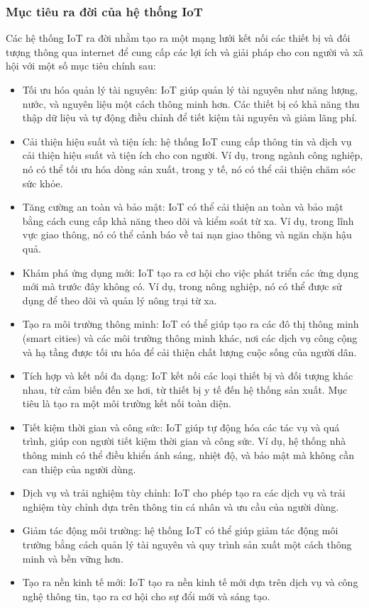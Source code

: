 \documentclass{article} %
\begin{document}
\subsubsection{Mục tiêu ra đời của hệ thống IoT}
Các hệ thống IoT ra đời nhằm tạo ra một mạng lưới kết nối các thiết bị và đối tượng thông qua internet để cung cấp các lợi ích và giải pháp cho con người và xã hội với một số mục tiêu chính sau:
\begin{itemize}
\item Tối ưu hóa quản lý tài nguyên: IoT giúp quản lý tài nguyên như năng lượng, nước, và nguyên liệu một cách thông minh hơn. Các thiết bị có khả năng thu thập dữ liệu và tự động điều chỉnh để tiết kiệm tài nguyên và giảm lãng phí.
\item Cải thiện hiệu suất và tiện ích: hệ thống IoT cung cấp thông tin và dịch vụ cải thiện hiệu suất và tiện ích cho con người. Ví dụ, trong ngành công nghiệp, nó có thể tối ưu hóa dòng sản xuất, trong y tế, nó có thể cải thiện chăm sóc sức khỏe.
\item Tăng cường an toàn và bảo mật: IoT có thể cải thiện an toàn và bảo mật bằng cách cung cấp khả năng theo dõi và kiểm soát từ xa. Ví dụ, trong lĩnh vực giao thông, nó có thể cảnh báo về tai nạn giao thông và ngăn chặn hậu quả.
\item Khám phá ứng dụng mới: IoT tạo ra cơ hội cho việc phát triển các ứng dụng mới mà trước đây không có. Ví dụ, trong nông nghiệp, nó có thể được sử dụng để theo dõi và quản lý nông trại từ xa.
\item Tạo ra môi trường thông minh: IoT có thể giúp tạo ra các đô thị thông minh (smart cities) và các môi trường thông minh khác, nơi các dịch vụ công cộng và hạ tầng được tối ưu hóa để cải thiện chất lượng cuộc sống của người dân.
\item Tích hợp và kết nối đa dạng: IoT kết nối các loại thiết bị và đối tượng khác nhau, từ cảm biến đến xe hơi, từ thiết bị y tế đến hệ thống sản xuất. Mục tiêu là tạo ra một môi trường kết nối toàn diện.
\item Tiết kiệm thời gian và công sức: IoT giúp tự động hóa các tác vụ và quá trình, giúp con người tiết kiệm thời gian và công sức. Ví dụ, hệ thống nhà thông minh có thể điều khiển ánh sáng, nhiệt độ, và bảo mật mà không cần can thiệp của người dùng.
\item Dịch vụ và trải nghiệm tùy chỉnh: IoT cho phép tạo ra các dịch vụ và trải nghiệm tùy chỉnh dựa trên thông tin cá nhân và ưu cầu của người dùng.
\item Giảm tác động môi trường: hệ thống IoT có thể giúp giảm tác động môi trường bằng cách quản lý tài nguyên và quy trình sản xuất một cách thông minh và bền vững hơn.
\item Tạo ra nền kinh tế mới: IoT tạo ra nền kinh tế mới dựa trên dịch vụ và công nghệ thông tin, tạo ra cơ hội cho sự đổi mới và sáng tạo.

\end{itemize}
\end{document}
